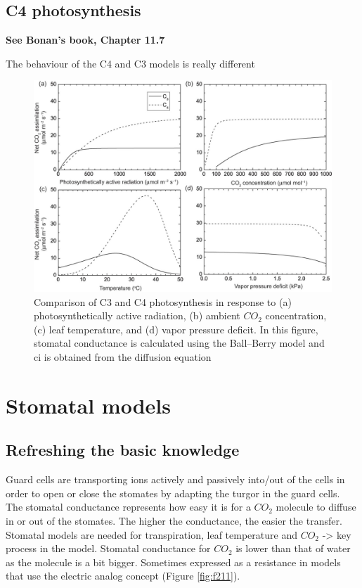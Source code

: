 \documentclass[12pt,oneside]{book}
\begin{document}
\subsection{C4 photosynthesis}\label{c4-photosynthesis}

\textbf{See Bonan's book, Chapter 11.7}

The behaviour of the C4 and C3 models is really different

\begin{figure}

{\centering \includegraphics[width=0.8\linewidth]{figures/chap2/c3_c4} 

}

\caption{Comparison of C3 and C4 photosynthesis in response to (a) photosynthetically active radiation, (b) ambient $CO_2$ concentration, (c) leaf temperature, and (d) vapor pressure deficit. In this figure, stomatal conductance is calculated using the Ball–Berry model and ci is obtained from the diffusion equation}\label{fig:f210b}
\end{figure}

\section{Stomatal models}\label{stomatal-models}

\subsection{Refreshing the basic
knowledge}\label{refreshing-the-basic-knowledge-1}

Guard cells are transporting ions actively and passively into/out of the
cells in order to open or close the stomates by adapting the turgor in
the guard cells. The stomatal conductance represents how easy it is for
a \(CO_2\) molecule to diffuse in or out of the stomates. The higher the
conductance, the easier the transfer. Stomatal models are needed for
transpiration, leaf temperature and \(CO_2\) -\textgreater{} key process
in the model. Stomatal conductance for \(CO_2\) is lower than that of
water as the molecule is a bit bigger. Sometimes expressed as a
resistance in models that use the electric analog concept (Figure
\ref{fig:f211}).
\end{document}
